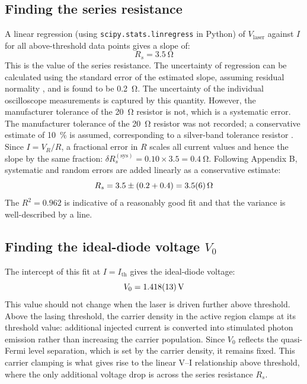 \documentclass[a4paper, 10pt]{article}
\begin{document}
\subsection{Finding the series resistance}

A linear regression (using \texttt{scipy.stats.linregress} in Python) of $V_\mathrm{laser}$ against $I$ for all above-threshold data points gives a slope of:
\begin{equation*}
    R_s = \SI{3.5}{\ohm}
\end{equation*}
This is the value of the series resistance. The uncertainty of regression can be calculated using the standard error of the estimated slope, assuming residual normality \cite{LinregressSciPyV1170}, and is found to be \SI{0.2}{\ohm}. The uncertainty of the individual oscilloscope measurements is captured by this quantity. However, the manufacturer tolerance of the \SI{20}{\ohm} resistor is not, which is a systematic error. The manufacturer tolerance of the \SI{20}{\ohm} resistor was not recorded; a conservative estimate of \SI{10}{\percent} is assumed, corresponding to a silver-band tolerance resistor \cite{iec60062}. Since $I = V_R / R$, a fractional error in $R$ scales all current values and hence the slope by the same fraction: $\delta R_s^{(\mathrm{sys})} = 0.10 \times 3.5 = \SI{0.4}{\ohm}$. Following Appendix B, systematic and random errors are added linearly as a conservative estimate:
\begin{equation*}
    R_s = 3.5 \pm (0.2 + 0.4) = \SI{3.5 +- 0.6}{\ohm}
\end{equation*}
The $R^2=0.962$ is indicative of a reasonably good fit and that the variance is well-described by a line.

\subsection{Finding the ideal-diode voltage $V_0$}

The intercept of this fit at $I=I_\mathrm{th}$ gives the ideal-diode voltage:
\begin{equation*}
    V_0 = \SI{1.418 +- 0.013}{\volt}
\end{equation*}
This value should not change when the laser is driven further above threshold. Above the lasing threshold, the carrier density in the active region clamps at its threshold value: additional injected current is converted into stimulated photon emission rather than increasing the carrier population. Since $V_0$ reflects the quasi-Fermi level separation, which is set by the carrier density, it remains fixed. This carrier clamping is what gives rise to the linear V--I relationship above threshold, where the only additional voltage drop is across the series resistance $R_s$.
\end{document}
